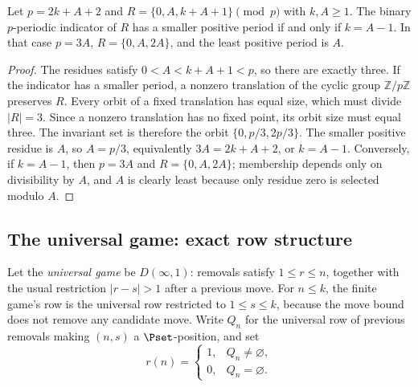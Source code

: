 \begin{proposition}\label{prop:Ccollapse}
Let $p=2k+A+2$ and $R=\{0,A,k+A+1\}\pmod p$ with $k,A\ge1$. The binary $p$-periodic indicator of $R$ has a smaller positive period if and only if $k=A-1$. In that case $p=3A$, $R=\{0,A,2A\}$, and the least positive period is $A$.
\end{proposition}
\begin{proof}
The residues satisfy $0<A<k+A+1<p$, so there are exactly three. If the indicator has a smaller period, a nonzero translation of the cyclic group $\mathbb Z/p\mathbb Z$ preserves $R$. Every orbit of a fixed translation has equal size, which must divide $|R|=3$. Since a nonzero translation has no fixed point, its orbit size must equal three. The invariant set is therefore the orbit $\{0,p/3,2p/3\}$. The smaller positive residue is $A$, so $A=p/3$, equivalently $3A=2k+A+2$, or $k=A-1$. Conversely, if $k=A-1$, then $p=3A$ and $R=\{0,A,2A\}$; membership depends only on divisibility by $A$, and $A$ is clearly least because only residue zero is selected modulo $A$.
\end{proof}

\subsection{The universal game: exact row structure}\label{sec:Cuniversal}
Let the \emph{universal game} be $D(\infty,1)$: removals satisfy $1\le r\le n$, together with the usual restriction $|r-s|>1$ after a previous move. For $n\le k$, the finite game's row is the universal row restricted to $1\le s\le k$, because the move bound does not remove any candidate move. Write $Q_n$ for the universal row of previous removals making $(n,s)$ a $\Pset$-position, and set
\[
r(n)=\begin{cases}1,&Q_n\ne\varnothing,\\0,&Q_n=\varnothing.\end{cases}
\]

